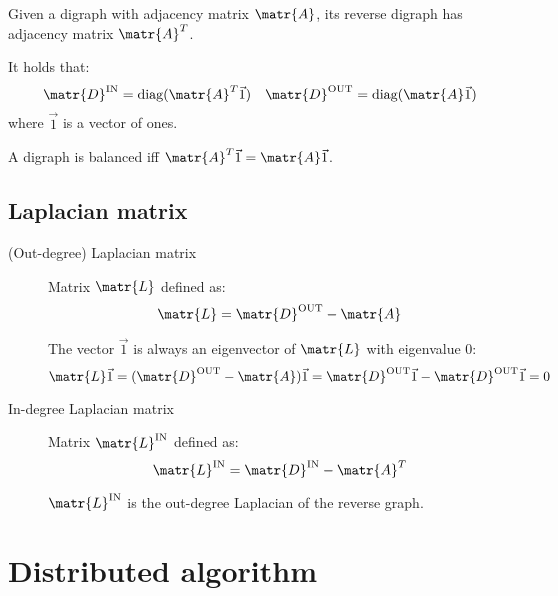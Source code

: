 \begin{description}
        \begin{remark}
            Given a digraph with adjacency matrix $\matr{A}$, its reverse digraph has adjacency matrix $\matr{A}^T$.
        \end{remark}

        \begin{remark}
            It holds that:
            \[ 
                \matr{D}^\text{IN} = \text{diag}(\matr{A}^T \vec{1}) 
                \quad
                \matr{D}^\text{OUT} = \text{diag}(\matr{A} \vec{1})
            \]
            where $\vec{1}$ is a vector of ones.
        \end{remark}

        \begin{remark}
            A digraph is balanced iff $\matr{A}^T \vec{1} = \matr{A} \vec{1}$.
        \end{remark}
\end{description}


\subsection{Laplacian matrix}

\begin{description}
    \item[(Out-degree) Laplacian matrix] 
        Matrix $\matr{L}$ defined as:
        \[ \matr{L} = \matr{D}^\text{OUT} - \matr{A} \]

        \begin{remark}
            The vector $\vec{1}$ is always an eigenvector of $\matr{L}$ with eigenvalue $0$:
            \[ \matr{L}\vec{1} = (\matr{D}^\text{OUT} - \matr{A})\vec{1} = \matr{D}^\text{OUT}\vec{1} - \matr{D}^\text{OUT}\vec{1} = 0 \]
        \end{remark}

    \item[In-degree Laplacian matrix] 
        Matrix $\matr{L}^\text{IN}$ defined as:
        \[ \matr{L}^\text{IN} = \matr{D}^\text{IN} - \matr{A}^T \]

        \begin{remark}
            $\matr{L}^\text{IN}$ is the out-degree Laplacian of the reverse graph.    
        \end{remark}
\end{description}



\section{Distributed algorithm}

